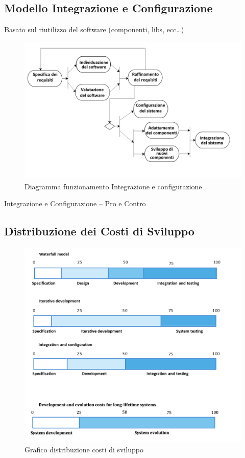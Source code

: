 \documentclass{article}
\begin{document}
	\subsection{Modello Integrazione e Configurazione}
	Basato sul riutilizzo del software (componenti, libs, ecc…)
	\begin{figure}[h]
		\centering
		\includegraphics[scale=0.3]{9.diag_int_conf.png}
		\caption{Diagramma funzionamento Integrazione e configurazione}
	\end{figure}
	Integrazione e Configurazione – Pro e Contro
	\subsection{Distribuzione dei Costi di Sviluppo}
	\begin{figure}[h]
		\centering
		\includegraphics[scale=0.3]{10.dist_cost_svil.png}
		\caption{Grafico distribuzione costi di sviluppo}
	\end{figure}
	
\end{document}
